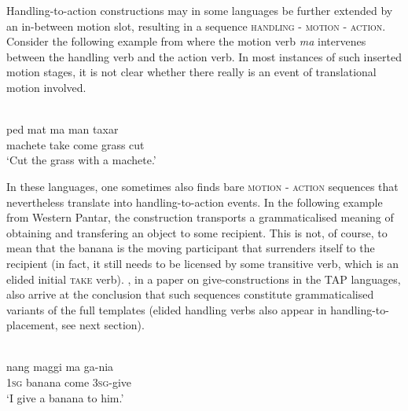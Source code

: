 Handling-to-action constructions may in some languages be further extended by an in-between motion slot, resulting in a sequence \textsc{handling - motion - action}. Consider the following example from  where the motion verb \textit{ma} intervenes between the handling verb and the action verb. In most instances of such inserted motion stages, it is not clear whether there really is an event of translational motion involved.

\ea 
{}\\
\gll ped mat ma man taxar \\
machete take come grass cut \\
\glft `Cut the grass with a machete.'\\ 
\z

In these languages, one sometimes also finds bare \textsc{motion - action} sequences that nevertheless translate into handling-to-action events. In the following example from Western Pantar, the construction transports a grammaticalised meaning of obtaining and transfering an object to some recipient. This is not, of course, to mean that the banana is the moving participant that surrenders itself to the recipient (in fact, it still needs to be licensed by some transitive verb, which is an elided initial \textsc{take} verb). \citet{klamer2012development}, in a paper on give-constructions in the TAP languages, also arrive at the conclusion that such sequences constitute grammaticalised variants of the full templates (elided handling verbs also appear in handling-to-placement, see next section).

\ea 
{}\\
\gll nang maggi ma ga-nia \\
\textsc{1}\textsc{sg} banana come \textsc{3}\textsc{sg}-give \\
\glft ‘I give a banana to him.’\\ 
\z

